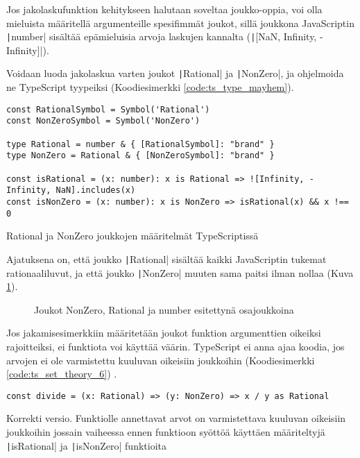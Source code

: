 Jos jakolaskufunktion kehitykseen halutaan soveltaa joukko-oppia, voi olla mieluista määritellä argumenteille spesifimmät joukot, sillä joukkona JavaScriptin \texttt|number| sisältää epämieluisia arvoja laskujen kannalta (\texttt|[NaN, Infinity, -Infinity]|).

Voidaan luoda jakolaskua varten joukot \texttt|Rational| ja \texttt|NonZero|, ja ohjelmoida ne TypeScript tyypeiksi (Koodiesimerkki \ref{code:ts_type_mayhem}).

\begin{code}
    \begin{verbatim}
const RationalSymbol = Symbol('Rational')
const NonZeroSymbol = Symbol('NonZero')

type Rational = number & { [RationalSymbol]: "brand" }
type NonZero = Rational & { [NonZeroSymbol]: "brand" }

const isRational = (x: number): x is Rational => ![Infinity, -Infinity, NaN].includes(x)
const isNonZero = (x: number): x is NonZero => isRational(x) && x !== 0
\end{verbatim}
    \caption{Rational ja NonZero joukkojen määritelmät TypeScriptissä}
    \label{code:ts_type_mayhem}
\end{code}

Ajatuksena on, että joukko \texttt|Rational| sisältää kaikki JavaScriptin tukemat rationaaliluvut, ja että joukko \texttt|NonZero| muuten sama paitsi ilman nollaa (Kuva \ref{fig:set-esimerkki}).



\begin{figure}[ht]
    \centering
    \caption{Joukot NonZero, Rational ja number esitettynä osajoukkoina}
    \label{fig:set-esimerkki}
\end{figure}


Jos jakamisesimerkkiin määritetään joukot funktion argumenttien oikeiksi rajoitteiksi, ei funktiota voi käyttää väärin. TypeScript ei anna ajaa koodia, jos arvojen ei ole varmistettu kuuluvan oikeisiin joukkoihin (Koodiesimerkki \ref{code:ts_set_theory_6}) \cite{typsecript_website}.

\begin{code}
    \begin{verbatim}
const divide = (x: Rational) => (y: NonZero) => x / y as Rational
\end{verbatim}
    \caption{Korrekti versio. Funktiolle annettavat arvot on varmistettava kuuluvan oikeisiin joukkoihin jossain vaiheessa ennen funktioon syöttöä käyttäen määriteltyjä \texttt|isRational| ja \texttt|isNonZero| funktioita }
    \label{code:ts_set_theory_6}
\end{code}

